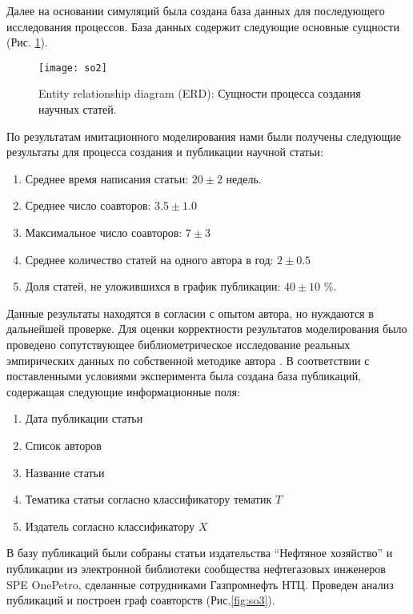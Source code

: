 Далее на основании симуляций была создана база данных для последующего исследования процессов.
База данных содержит следующие основные сущности (Рис. \ref{fig:so2}).

\begin{figure}[H]
  \caption{Entity relationship diagram (ERD): Сущности процесса создания научных статей.}
  \centering
    \texttt{[image: so2]}
  \label{fig:so2}
\end{figure}  

По результатам имитационного моделирования нами были получены следующие результаты для процесса создания и публикации научной статьи:
\begin{enumerate}
\item Среднее время написания статьи: $20 \pm 2$ недель.
\item Среднее число соавторов: $3.5 \pm 1.0$
\item Максимальное число соавторов: $7 \pm 3$
\item Среднее количество статей на одного автора в год: $2 \pm  0.5$
\item Доля статей, не уложившихся в график публикации: $40 \pm 10$ \%.
\end{enumerate}

Данные результаты находятся в согласии с опытом автора, но нуждаются в дальнейшей проверке.
Для оценки корректности результатов моделирования было проведено сопутствующее библиометрическое исследование реальных эмпирических данных по собственной методике автора \cite{KDGY}. 
В соответствии с поставленными условиями эксперимента была создана база публикаций, содержащая следующие информационные поля:

\begin{enumerate}
\tightlist
\item Дата публикации статьи
\item Список авторов
\item Название статьи
\item Тематика статьи согласно классификатору тематик $T$
\item Издатель согласно классификатору $X$
\end{enumerate}

В базу публикаций были собраны статьи издательства ``Нефтяное хозяйство'' и публикации из электронной библиотеки сообщества нефтегазовых инженеров SPE OnePetro, сделанные сотрудниками Газпромнефть НТЦ.
Проведен анализ публикаций и построен граф соавторств (Рис.\ref{fig:so3}).

